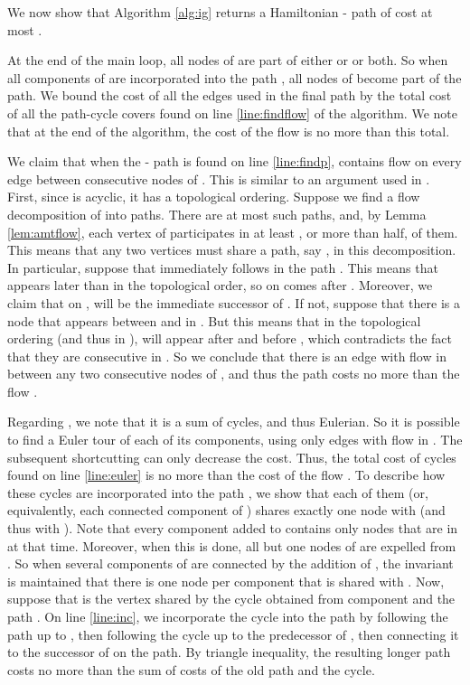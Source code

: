 \documentclass[11pt]{article}
\newcommand{\qed}{\hspace*{\fill}}
\newenvironment{proofof}[1]{\medskip \noindent {\bf{Proof of #1. }}}{\qed}
\begin{document}
\medskip



We now show that Algorithm \ref{alg:ig} returns a Hamiltonian - path of cost at most .



\begin{proofof}{Theorem \ref{thm:ig}}
At the end of the main loop, all nodes of  are part of either  or  or both. So when 
all components of  are incorporated into the path , all nodes of  become part of the path. 
We bound the cost of all the edges used in the final path by the total cost of all the path-cycle covers found on 
line \ref{line:findflow} of the algorithm. We note that at the end of the algorithm, the cost of 
the flow  is no more than this total.

We claim that when the - path  is found on line \ref{line:findp},   contains flow on 
every edge between consecutive nodes of . 
This is similar to an argument used in \cite{nagarajan:ravi:latency}.
First, since  is acyclic, it has a topological ordering. Suppose we find a flow decomposition of  into paths. There are at most  
such paths, and, by Lemma \ref{lem:amtflow}, each vertex of  participates in at least 
, or more than half, of them.  This means that any two vertices  must 
share a path, say , in this decomposition. In particular, suppose that  immediately 
follows  in the path . This means that  appears later than  in the topological 
order, so on   comes after . Moreover, we claim that on ,  will be the immediate 
successor of . If not, suppose that there is a node  that appears between  and  in . 
But this means that in the topological ordering (and thus in ),  will appear after  and 
before , which contradicts the fact that they are consecutive in . So we conclude that there 
is an edge with flow in  between any two consecutive nodes of , and thus the path  costs 
no more than the flow . 

Regarding , we note that it is a sum of cycles, and thus Eulerian. So it is possible to find a 
Euler tour of each of its components, using only edges with flow in . The subsequent shortcutting 
can only decrease the cost. Thus, the total cost of cycles found on line \ref{line:euler} is no more 
than the cost of the flow . To describe how these cycles are incorporated into the path , we 
show that each of them (or, equivalently, each connected component of ) shares exactly one node with  (and thus with ). Note that every  component  added to  contains only 
nodes that are in  at that time. Moreover, when this is done, all but one nodes of  are 
expelled from . So when several components of  are connected by the addition of , the 
invariant is maintained that there is one node per component that is shared with . Now, 
suppose that  is the vertex shared by the cycle obtained from component  and the path . 
On line \ref{line:inc}, we incorporate the cycle into the path by following the path up to , 
then following the cycle up to the predecessor of , then connecting it to the successor of  
on the path. By triangle inequality, the resulting longer path costs no more than the sum of costs 
of the old path and the cycle.
\end{proofof}
\end{document}
